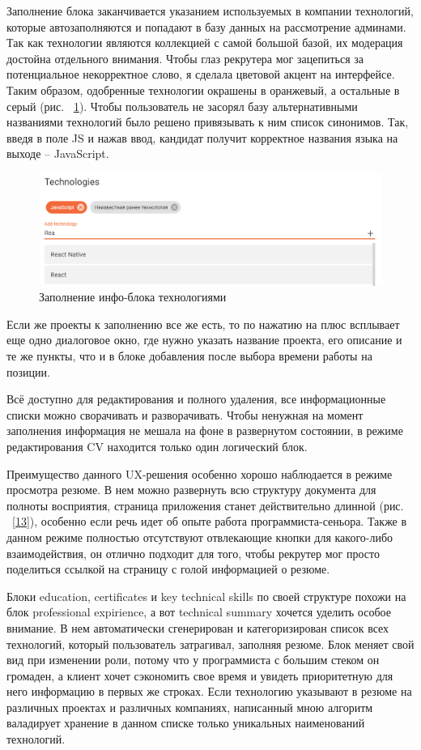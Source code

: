 \documentclass[a4paper,12pt]{diplom}
\begin{document}
Заполнение блока заканчивается указанием используемых в компании технологий, которые автозаполняются и попадают в базу данных на рассмотрение админами.
Так как технологии являются коллекцией с самой большой базой, их модерация достойна отдельного внимания. Чтобы глаз рекрутера мог зацепиться за потенциальное некорректное слово, я
сделала цветовой акцент на интерфейсе. Таким образом, одобренные технологии окрашены в оранжевый, а остальные в серый (рис. ~\ref{12}). Чтобы пользователь не засорял базу альтернативными названиями технологий было решено привязывать к ним список синонимов. Так, введя в поле JS и нажав ввод,
кандидат получит корректное названия языка на выходе -- JavaScript.

\begin{figure}[!ht]
	\centering
	\includegraphics[width=1\textwidth]{resources/technologies.png}
	\caption{Заполнение инфо-блока технологиями}
	\label{12}
\end{figure}

Если же проекты к заполнению все же есть, то по нажатию на плюс всплывает еще одно диалоговое окно, где нужно
указать название проекта, его описание и те же пункты, что и в блоке добавления после выбора времени работы на позиции.

Всё доступно для редактирования и полного удаления, все информационные списки можно сворачивать и разворачивать. Чтобы ненужная на момент заполнения информация не мешала на фоне в развернутом состоянии, в режиме редактирования CV находится
только один логический блок.

Преимущество данного UX-решения особенно хорошо наблюдается в режиме просмотра резюме. В нем можно развернуть всю структуру документа для полноты восприятия, страница приложения станет действительно длинной (рис. ~\ref{13}), особенно если речь идет об опыте работа программиста-сеньора.
Также в данном режиме полностью отсутствуют отвлекающие кнопки для какого-либо взаимодействия, он отлично подходит для того, чтобы рекрутер мог просто поделиться ссылкой на страницу с голой информацией о резюме.

Блоки education, certificates и key technical skills по своей структуре похожи на блок professional expirience, а вот technical summary хочется уделить особое внимание.
В нем автоматически сгенерирован и категоризирован список всех технологий, который пользователь затрагивал, заполняя резюме. Блок меняет свой вид при изменении роли, потому что у программиста с большим стеком он
громаден, а клиент хочет сэкономить свое время и увидеть приоритетную для него информацию в первых же строках. Если технологию указывают в резюме на различных проектах и различных компаниях, написанный мною алгоритм валадирует хранение в данном списке только уникальных наименований технологий.
\end{document}

